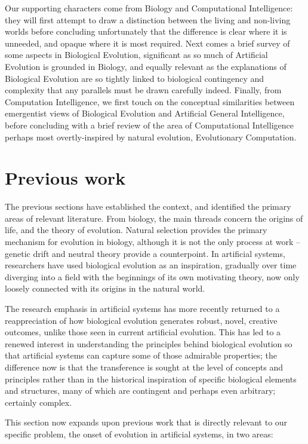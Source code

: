\documentclass[]{report}
\begin{document}
Our supporting characters come from Biology and Computational Intelligence: they will first attempt to draw a distinction between the living and non-living worlds before concluding unfortunately that the difference is clear where it is unneeded, and opaque where it is most required. Next comes a brief survey of some aspects in Biological Evolution, significant as so much of Artificial Evolution is grounded in Biology, and equally relevant as the explanations of Biological Evolution are so tightly linked to biological contingency and complexity that any parallels must be drawn carefully indeed. Finally, from Computation Intelligence, we first touch on the conceptual similarities between emergentist views of Biological Evolution and Artificial General Intelligence, before concluding with a brief review of the area of Computational Intelligence perhaps most overtly-inspired by natural evolution, Evolutionary Computation.

\chapter{Previous work}
The previous sections have established the context, and identified the primary areas of relevant literature. From biology, the main threads concern the origins of life, and the theory of evolution. Natural selection provides the primary mechanism for evolution in biology, although it is not the only process at work -- genetic drift and neutral theory provide a counterpoint. In artificial systems, researchers have used biological evolution as an inspiration, gradually over time diverging into a field with the beginnings of its own motivating theory, now only loosely connected with its origins in the natural world.

The research emphasis in artificial systems has more recently returned to a reappreciation of how biological evolution generates robust, novel, creative outcomes, unlike those seen in current artificial evolution. This has led to a renewed interest in understanding the principles behind biological evolution so that artificial systems can capture some of those admirable properties; the difference now is that the transference is sought at the level of concepts and principles rather than in the historical inspiration of specific biological elements and structures, many of which are contingent and perhaps even arbitrary; certainly complex.

This section now expands upon previous work that is directly relevant to our specific problem, the onset of evolution in artificial systems, in two areas:
\end{document}
